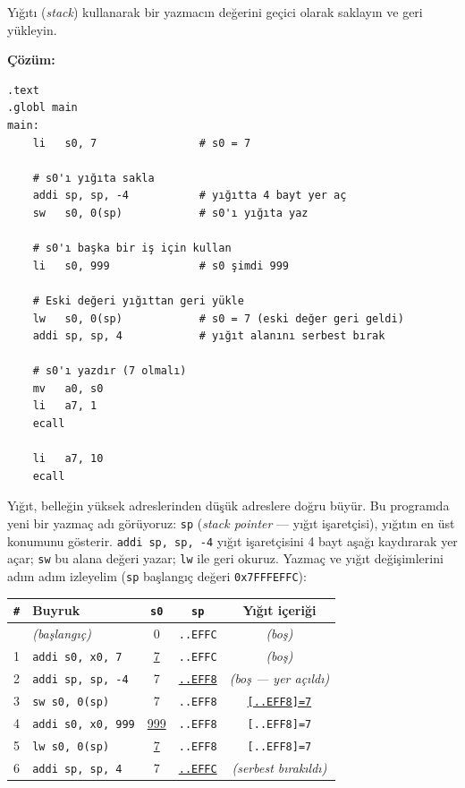 \begin{ornek}[4.3]
\label{orn:yigit-temel}
Yığıtı (\emph{stack}) kullanarak bir yazmacın değerini geçici olarak saklayın ve geri yükleyin.

\textbf{Çözüm:}

\begin{lstlisting}[style=riscv]
.text
.globl main
main:
    li   s0, 7                # s0 = 7

    # s0'ı yığıta sakla
    addi sp, sp, -4           # yığıtta 4 bayt yer aç
    sw   s0, 0(sp)            # s0'ı yığıta yaz

    # s0'ı başka bir iş için kullan
    li   s0, 999              # s0 şimdi 999

    # Eski değeri yığıttan geri yükle
    lw   s0, 0(sp)            # s0 = 7 (eski değer geri geldi)
    addi sp, sp, 4            # yığıt alanını serbest bırak

    # s0'ı yazdır (7 olmalı)
    mv   a0, s0
    li   a7, 1
    ecall

    li   a7, 10
    ecall
\end{lstlisting}

Yığıt, belleğin yüksek adreslerinden düşük adreslere doğru büyür. Bu programda yeni bir yazmaç adı görüyoruz: \texttt{sp} (\emph{stack pointer} --- yığıt işaretçisi), yığıtın en üst konumunu gösterir. \texttt{addi sp, sp, -4} yığıt işaretçisini 4 bayt aşağı kaydırarak yer açar; \texttt{sw} bu alana değeri yazar; \texttt{lw} ile geri okuruz. Yazmaç ve yığıt değişimlerini adım adım izleyelim (\texttt{sp} başlangıç değeri \texttt{0x7FFFEFFC}):

\begin{center}
\small
\begin{tabular}{clccc}
\toprule
\texttt{\#} & Buyruk & \texttt{s0} & \texttt{sp} & Yığıt içeriği \\
\midrule
   & \emph{(başlangıç)} & 0 & \texttt{..EFFC} & \emph{(boş)} \\
1 & \texttt{addi s0, x0, 7} & \underline{7} & \texttt{..EFFC} & \emph{(boş)} \\
2 & \texttt{addi sp, sp, -4} & 7 & \underline{\texttt{..EFF8}} & \emph{(boş --- yer açıldı)} \\
3 & \texttt{sw s0, 0(sp)} & 7 & \texttt{..EFF8} & \underline{\texttt{[..EFF8]=7}} \\
4 & \texttt{addi s0, x0, 999} & \underline{999} & \texttt{..EFF8} & \texttt{[..EFF8]=7} \\
5 & \texttt{lw s0, 0(sp)} & \underline{7} & \texttt{..EFF8} & \texttt{[..EFF8]=7} \\
6 & \texttt{addi sp, sp, 4} & 7 & \underline{\texttt{..EFFC}} & \emph{(serbest bırakıldı)} \\
\bottomrule
\end{tabular}
\end{center}


\end{ornek}

